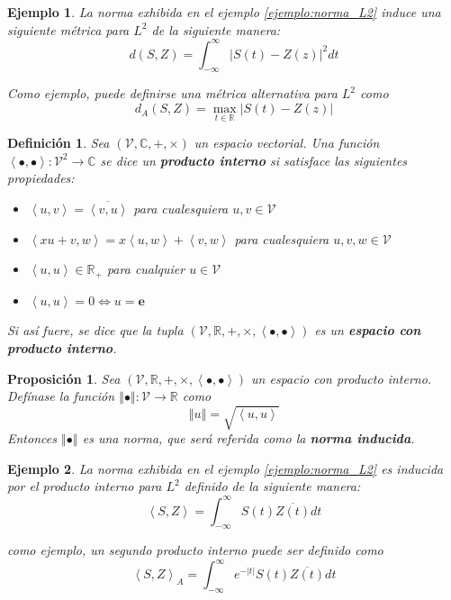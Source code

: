 \documentclass[12pt,letterpaper]{book}
\newtheorem{definicion}{Definición}[chapter]
\newtheorem{proposicion}[teorema]{Proposición}
\newtheorem{ejemplo}{Ejemplo}[chapter]
\newcommand{\R}{\mathbb{R}}
\newcommand{\C}{\mathbb{C}}
\newcommand{\intR}{\int_{-\infty}^{\infty}}
\newcommand{\abso}[1]{\left| #1 \right|}
\newcommand{\norma}[1]{\left\Vert #1 \right\Vert}
\newcommand{\producto}[1]{\left\langle #1 \right\rangle}
\begin{document}
\begin{ejemplo}
La norma exhibida en el ejemplo \ref{ejemplo:norma_L2} induce una siguiente métrica para $L^{2}$ de la siguiente manera:
\begin{equation}
d(S,Z) = \intR \abso{S(t) - Z(z)}^{2} dt
\end{equation}

Como ejemplo, puede definirse una métrica alternativa para $L^{2}$ como
\begin{equation}
d_A(S,Z) = \max_{t \in \R} \abso{S(t) - Z(z)}
\end{equation}
\end{ejemplo}

\begin{definicion}
Sea $(\mathcal{V},\C,+,\times)$ un espacio vectorial. Una función $\producto{\bullet,\bullet} : \mathcal{V}^{2}\rightarrow \C$ se dice un \textbf{producto interno} si satisface las siguientes propiedades:
\begin{itemize}
\item $\producto{u,v} = \overline{\producto{v,u}}$ para cualesquiera $u,v \in \mathcal{V}$
\item $\producto{x u + v, w} = x \producto{u,w} + \producto{v,w}$ para cualesquiera $u,v,w \in \mathcal{V}$
\item $\producto{u,u} \in \R_+$ para cualquier $u \in \mathcal{V}$
\item $\producto{u,u} = 0 \Leftrightarrow u = \boldsymbol{e}$
\end{itemize}
Si así fuere, se dice que la tupla $(\mathcal{V},\R,+,\times, \producto{\bullet,\bullet})$ es un \textbf{espacio con producto interno}.
\end{definicion}

\begin{proposicion}
Sea $(\mathcal{V},\R,+,\times, \producto{\bullet,\bullet})$ un espacio con producto interno. Defínase la función $\norma{\bullet}: \mathcal{V} \rightarrow \R$ como
\begin{equation}
\norma{u} = \sqrt{\producto{u,u}}
\end{equation}
Entonces $\norma{\bullet}$ es una norma, que será referida como la \textbf{norma inducida}.
\end{proposicion}

\begin{ejemplo}
La norma exhibida en el ejemplo \ref{ejemplo:norma_L2} es inducida por el producto interno para $L^{2}$ definido de la siguiente manera:
\begin{equation}
\producto{S,Z} = \intR S(t) \overline{Z(t)} dt
\end{equation}

como ejemplo, un segundo producto interno puede ser definido como
\begin{equation}
\producto{S,Z}_A = \intR e^{-\abso{t}} S(t) \overline{Z(t)} dt
\end{equation}
\end{ejemplo}
\end{document}

